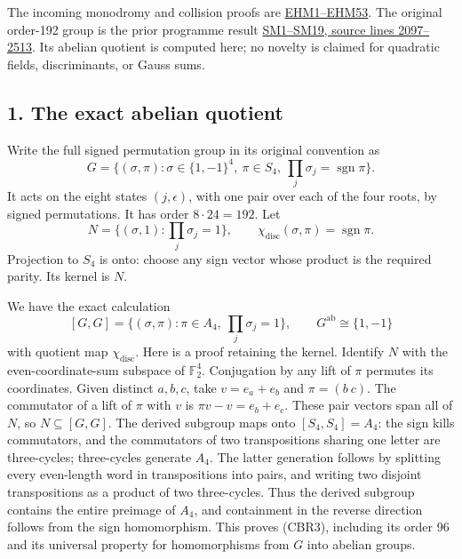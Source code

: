 \documentclass[
  10pt,
  a4paper,
]{article}
\begin{document}
The incoming monodromy and collision proofs are
\href{https://github.com/KokunoYumeto/zeta-function-research-reader/blob/adfbfe74fa49e31cb7aa068cf755fb083be37c32/workbenches/splitzero-tandem/branches/tau-zero-prime-positivity/EIGHT_STATE_HOLONOMY_DERIVATION.md}{EHM1--EHM53}.
The original order-192 group is the prior programme result
\href{https://github.com/KokunoYumeto/zeta-function-research-reader/blob/ab45e221579a0d48ce2885b4ecdf1a6aefc24a20/workbenches/splitzero-tandem/continuations/20260920-fable-boundary-action/FABLE_TO_ORIGINAL_CONDUCTOR.tex\#L2097}{SM1--SM19,
source lines 2097--2513}. Its abelian quotient is computed here; no
novelty is claimed for quadratic fields, discriminants, or Gauss sums.

\subsection{1. The exact abelian
quotient}\label{the-exact-abelian-quotient}

Write the full signed permutation group in its original convention as \[
G=\{(\sigma,\pi):\sigma\in\{1,-1\}^4,\ \pi\in S_4,
\ \prod_j\sigma_j=\operatorname{sgn}\pi\}.
\tag{CBR1}
\] It acts on the eight states \((j,\epsilon)\), with one pair over each
of the four roots, by signed permutations. It has order
\(8\cdot24=192\). Let \[
N=\{(\sigma,1):\prod_j\sigma_j=1\},\qquad
\chi_{\mathrm{disc}}(\sigma,\pi)=\operatorname{sgn}\pi.
\tag{CBR2}
\] Projection to \(S_4\) is onto: choose any sign vector whose product
is the required parity. Its kernel is \(N\).

We have the exact calculation \[
[G,G]=\{(\sigma,\pi):\pi\in A_4,\ \prod_j\sigma_j=1\},
\qquad G^{\mathrm{ab}}\cong\{1,-1\}
\tag{CBR3}
\] with quotient map \(\chi_{\mathrm{disc}}\). Here is a proof retaining
the kernel. Identify \(N\) with the even-coordinate-sum subspace of
\(\mathbb F_2^4\). Conjugation by any lift of \(\pi\) permutes its
coordinates. Given distinct \(a,b,c\), take \(v=e_a+e_b\) and
\(\pi=(b\ c)\). The commutator of a lift of \(\pi\) with \(v\) is
\(\pi v-v=e_b+e_c\). These pair vectors span all of \(N\), so
\(N\subseteq[G,G]\). The derived subgroup maps onto \([S_4,S_4]=A_4\):
the sign kills commutators, and the commutators of two transpositions
sharing one letter are three-cycles; three-cycles generate \(A_4\). The
latter generation follows by splitting every even-length word in
transpositions into pairs, and writing two disjoint transpositions as a
product of two three-cycles. Thus the derived subgroup contains the
entire preimage of \(A_4\), and containment in the reverse direction
follows from the sign homomorphism. This proves (CBR3), including its
order 96 and its universal property for homomorphisms from \(G\) into
abelian groups.
\end{document}
